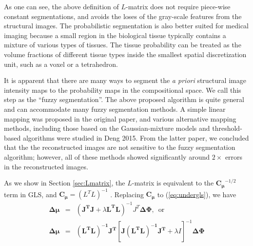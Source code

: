 \documentclass{article}
\begin{document}
As one can see, the above definition of $L$-matrix does not require piece-wise constant segmentations, and avoids the loses of the gray-scale features from the structural images. The probabilistic segmentation is also better suited for medical imaging because a small region in the biological tissue typically contains a mixture of various types of tissues. The tissue probability can be treated as the volume fractions of different tissue types inside the smallest spatial discretization unit, such as a voxel or a tetrahedron.

It is apparent that there are many ways to segment the \emph{a priori} structural image intensity maps to the probability maps in the compositional space. We call this step as the ``fuzzy segmentation''. The above proposed algorithm is quite general and can accommodate many fuzzy segmentation methods. A simple linear mapping was proposed in the original paper, and various alternative mapping methods, including those based on the Gaussian-mixture models and threshold-based algorithms were studied in Deng 2015. From the latter paper, we concluded that the the reconstructed images are not sensitive to the fuzzy segmentation algorithm; however, all of these methods showed significantly around $2\times$ errors in the reconstructed images.

As we show in Section \ref{sec:Lmatrix}, the $L$-matrix is equivalent to the $\mathbf{C_\mu}^{-1/2}$ term in GLS, and $\mathbf{C_\mu}=(L^TL)^{-1}$ . Replacing $\mathbf{C_\mu}$ to (\ref{eq:undergls}), we have
\begin{eqnarray}
\mathbf{\Delta\mu}&=& (\mathbf{J^TJ}+\lambda \mathbf{L^TL})^{-1}J^T\mathbf{\Delta\Phi},\,\textrm{ or}\\
\mathbf{\Delta\mu}&=&\mathbf{(L^TL)^{-1} J^T}\left[\mathbf{J(L^TL)^{-1}J^T}+\lambda I\right]^{-1}\mathbf{\Delta\Phi}
\end{eqnarray}
\end{document}
